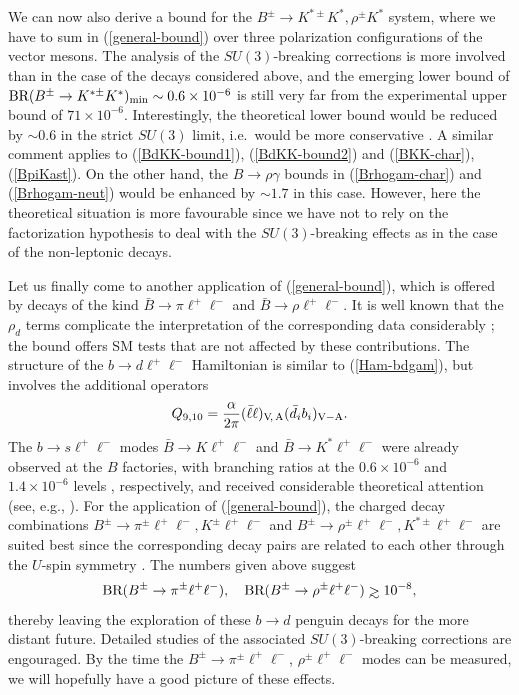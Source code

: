 \documentclass[12pt]{article}
\begin{document}
We can now also derive a bound for the  
$B^\pm\to K^{\ast\pm}K^{\ast}, \rho^\pm K^\ast$ system, where 
we have to sum in (\ref{general-bound}) over three polarization configurations
of the vector mesons. The analysis of the $SU(3)$-breaking corrections is
more involved than in the case of the decays considered above, and the 
emerging lower bound of 
$\mbox{BR}(B^\pm\to K^{\ast\pm} K^\ast)_{\rm min}\sim0.6\times 10^{-6}$
is still very far from the experimental upper bound of $71\times 10^{-6}$.
Interestingly, the theoretical lower bound would be reduced by $\sim 0.6$ in 
the strict $SU(3)$ limit, i.e.\ would be more conservative \cite{FR2}. A similar 
comment applies to (\ref{BdKK-bound1}), (\ref{BdKK-bound2}) and  
(\ref{BKK-char}), (\ref{BpiKast}). On the other hand, the 
$B\to\rho\gamma$ bounds in (\ref{Brhogam-char}) and 
(\ref{Brhogam-neut}) would be enhanced by $\sim 1.7$ in this case.
However, here the theoretical situation is more favourable since we 
have not to rely on the factorization hypothesis to deal with the 
$SU(3)$-breaking effects as in the case of the non-leptonic decays. 

Let us finally come to another application of (\ref{general-bound}), which 
is offered by decays of the kind $\bar B\to \pi \ell^+\ell^-$ and 
$\bar B\to \rho \ell^+\ell^-$. It is
well known that the $\rho_d$ terms complicate the interpretation of
the corresponding data considerably \cite{LHC-Book}; the bound offers
SM tests that are not affected by these contributions. The 
structure of the $b\to d \ell^+\ell^-$ Hamiltonian is similar to 
(\ref{Ham-bdgam}), but involves the additional operators
\begin{equation}
Q_{9,10}=\frac{\alpha}{2\pi}(\bar\ell\ell)_{\rm V\!,\,A}
(\bar d_i b_i)_{\rm V-A}.
\end{equation}
The $b \to s \ell^+\ell^-$ modes $\bar B\to K \ell^+\ell^-$ 
and $\bar B\to K^\ast \ell^+\ell^-$ were already observed at the $B$ 
factories, with branching ratios at the $0.6\times 10^{-6}$ and 
$1.4\times 10^{-6}$ levels \cite{HFAG}, respectively, and received considerable
theoretical attention (see, e.g., \cite{BKll}). For the application
of (\ref{general-bound}), the charged decay combinations
$B^\pm\to \pi^\pm \ell^+\ell^-, K^\pm \ell^+\ell^-$ and
$B^\pm\to \rho^\pm \ell^+\ell^-, K^{\ast\pm} \ell^+\ell^-$ are suited
best since the corresponding decay pairs are related to each other 
through the $U$-spin symmetry \cite{HM}. The numbers given above
suggest
\begin{equation}\label{Bpi-ellell-bounds}
\mbox{BR}(B^\pm\to \pi^\pm \ell^+\ell^-), \quad
\mbox{BR}(B^\pm\to \rho^\pm \ell^+\ell^-)
\mathrel{\hbox{\rlap{\hbox{\lower4pt\hbox{$\sim$}}}\hbox{$>$}}}
10^{-8},
\end{equation}
thereby leaving the exploration of these $b\to d$ penguin decays for the more 
distant future. Detailed studies of the associated $SU(3)$-breaking corrections 
are engouraged. By the time the $B^\pm\to \pi^\pm \ell^+\ell^-$, 
$\rho^\pm \ell^+\ell^-$ modes can be measured, we will
hopefully have a good picture of these effects. 
\end{document}
